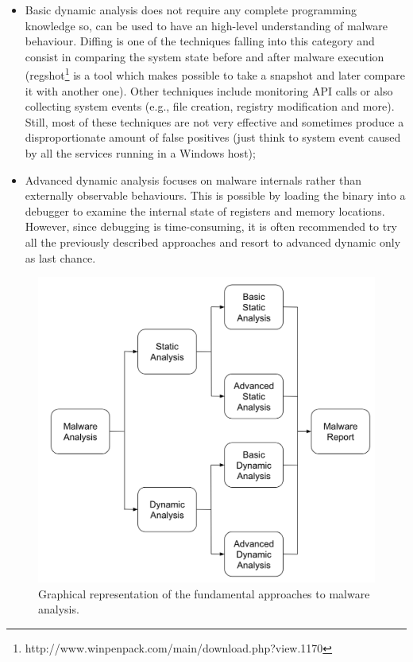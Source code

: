 \documentclass[LaM,binding=0.6cm]{sapthesis}
\begin{document}
\begin{itemize}
\begin{itemize}
\item Basic dynamic analysis does not require any complete programming knowledge so, can be used to have an high-level understanding of malware behaviour. Diffing is one of the techniques falling into this category and consist in comparing the system state before and after malware execution (regshot\footnote{http://www.winpenpack.com/main/download.php?view.1170} is a tool which makes possible to take a snapshot and later compare it with another one). Other techniques include monitoring API calls or also collecting system events (e.g., file creation, registry modification and more). Still, most of these techniques are not very effective and sometimes produce a disproportionate amount of false positives (just think to system event caused by all the services running in a Windows host);
\item Advanced dynamic analysis focuses on malware internals rather than externally observable behaviours. This is possible by loading the binary into a debugger to examine the internal state of registers and memory locations. However, since debugging is time-consuming, it is often recommended to try all the previously described approaches and resort to advanced dynamic only as last chance.
\end{itemize}
\end{itemize}

\begin{figure}[h!]
\centering
\includegraphics[scale=.5]{images/background3}
\caption{Graphical representation of the fundamental approaches to malware analysis.}
\end{figure}
\end{document}
